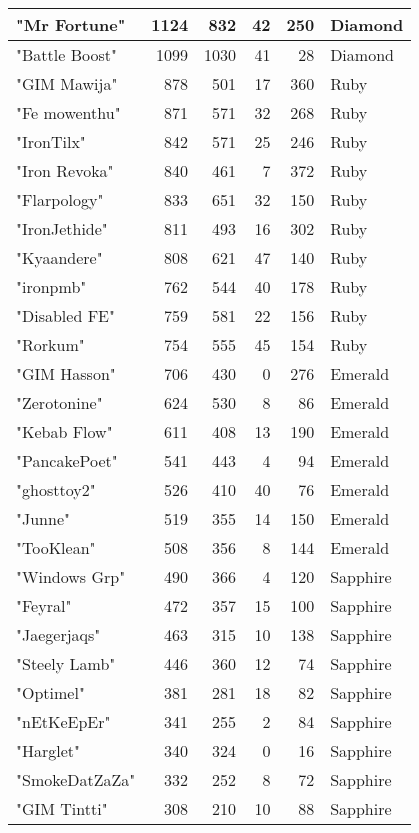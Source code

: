 \documentclass{article}
\begin{document}
\begin{table}[htbp]
\begin{tabular}{|l|r|r|r|r|l|}
"Mr Fortune" & 1124 & 832 & 42 & 250 & Diamond \\ \hline
"Battle Boost" & 1099 & 1030 & 41 & 28 & Diamond \\ \hline
"GIM Mawija" & 878 & 501 & 17 & 360 & Ruby \\ \hline
"Fe mowenthu" & 871 & 571 & 32 & 268 & Ruby \\ \hline
"IronTilx" & 842 & 571 & 25 & 246 & Ruby \\ \hline
"Iron Revoka" & 840 & 461 & 7 & 372 & Ruby \\ \hline
"Flarpology" & 833 & 651 & 32 & 150 & Ruby \\ \hline
"IronJethide" & 811 & 493 & 16 & 302 & Ruby \\ \hline
"Kyaandere" & 808 & 621 & 47 & 140 & Ruby \\ \hline
"ironpmb" & 762 & 544 & 40 & 178 & Ruby \\ \hline
"Disabled FE" & 759 & 581 & 22 & 156 & Ruby \\ \hline
"Rorkum" & 754 & 555 & 45 & 154 & Ruby \\ \hline
"GIM Hasson" & 706 & 430 & 0 & 276 & Emerald \\ \hline
"Zerotonine" & 624 & 530 & 8 & 86 & Emerald \\ \hline
"Kebab Flow" & 611 & 408 & 13 & 190 & Emerald \\ \hline
"PancakePoet" & 541 & 443 & 4 & 94 & Emerald \\ \hline
"ghosttoy2" & 526 & 410 & 40 & 76 & Emerald \\ \hline
"Junne" & 519 & 355 & 14 & 150 & Emerald \\ \hline
"TooKlean" & 508 & 356 & 8 & 144 & Emerald \\ \hline
"Windows Grp" & 490 & 366 & 4 & 120 & Sapphire \\ \hline
"Feyral" & 472 & 357 & 15 & 100 & Sapphire \\ \hline
"Jaegerjaqs" & 463 & 315 & 10 & 138 & Sapphire \\ \hline
"Steely Lamb" & 446 & 360 & 12 & 74 & Sapphire \\ \hline
"Optimel" & 381 & 281 & 18 & 82 & Sapphire \\ \hline
"nEtKeEpEr" & 341 & 255 & 2 & 84 & Sapphire \\ \hline
"Harglet" & 340 & 324 & 0 & 16 & Sapphire \\ \hline
"SmokeDatZaZa" & 332 & 252 & 8 & 72 & Sapphire \\ \hline
"GIM Tintti" & 308 & 210 & 10 & 88 & Sapphire \\ \hline

\end{tabular}
\end{table}
\end{document}
